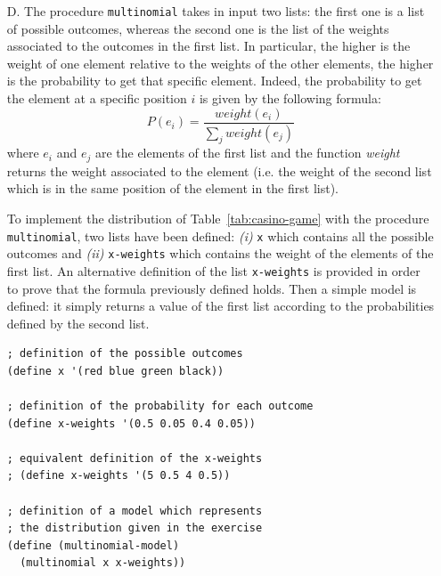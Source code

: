 \begin{itemize}
    \item[D.] The procedure \texttt{multinomial} takes in input two lists: the first one is a list of possible outcomes, whereas the 
        second one is the list of the weights associated to the outcomes in the first list. In particular, the higher is the weight
        of one element relative to the weights of the other elements, the higher is the probability to get that specific
        element. Indeed, the probability to get the element at a specific position $i$ is given by the following formula:
        \[ P(e_{i}) = \frac{weight(e_{i})}{\sum_{j} weight(e_{j})} \]
        where $e_{i}$ and $e_{j}$ are the elements of the first list and the function \textit{weight} returns the weight associated
        to the element (i.e. the weight of the second list which is in the same position of the element in the first list).

        To implement the distribution of Table~\ref{tab:casino-game} with the procedure \texttt{multinomial}, two lists have been
        defined: \textit{(i)} \texttt{x} which contains all the possible outcomes and \textit{(ii)} \texttt{x-weights} which contains
        the weight of the elements of the first list. An alternative definition of the list \texttt{x-weights} is provided in order to
        prove that the formula previously defined holds.
        Then a simple model is defined: it simply returns a value of the first list according to the probabilities defined by the
        second list.
        \begin{lstlisting}[caption={Program which implements with \texttt{multinomial} the distribution of Table~\ref{tab:casino-game}}, 
            captionpos=b, label={lst:casino-game-d}]
; definition of the possible outcomes
(define x '(red blue green black))

; definition of the probability for each outcome
(define x-weights '(0.5 0.05 0.4 0.05))

; equivalent definition of the x-weights
; (define x-weights '(5 0.5 4 0.5))

; definition of a model which represents 
; the distribution given in the exercise
(define (multinomial-model)
  (multinomial x x-weights))


\end{lstlisting}
\end{itemize}
